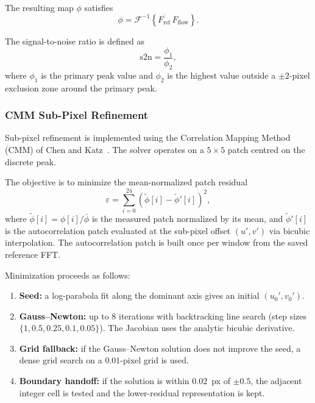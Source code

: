 \documentclass[11pt]{article}
\begin{document}
The resulting map $\phi$ satisfies
\begin{equation}
  \phi = \mathcal{F}^{-1}\!\left\{\overline{F_{\mathrm{ref}}}\,F_{\mathrm{flow}}\right\}.
\end{equation}

The signal-to-noise ratio is defined as
\begin{equation}
  \mathrm{s2n} = \frac{\phi_1}{\phi_2},
\end{equation}
where $\phi_1$ is the primary peak value and $\phi_2$ is the highest value
outside a $\pm 2$-pixel exclusion zone around the primary peak.

\subsubsection{CMM Sub-Pixel Refinement}
\label{sec:cmm}

Sub-pixel refinement is implemented using the Correlation Mapping Method
(CMM) of Chen and Katz~\cite{chen2005cmm}. The solver operates on a
$5 \times 5$ patch centred on the discrete peak.

The objective is to minimize the mean-normalized patch residual
\begin{equation}
  \varepsilon = \sum_{i=0}^{24}
    \left(\tilde{\phi}[i] - \tilde{\phi}'[i]\right)^2,
  \label{eq:cmm_obj}
\end{equation}
where $\tilde{\phi}[i] = \phi[i] / \bar{\phi}$ is the measured patch
normalized by its mean, and $\tilde{\phi}'[i]$ is the autocorrelation patch
evaluated at the sub-pixel offset $(u', v')$ via bicubic interpolation.
The autocorrelation patch is built once per window from the saved reference
FFT.

Minimization proceeds as follows:
\begin{enumerate}[noitemsep]
  \item \textbf{Seed:} a log-parabola fit along the dominant axis gives an
        initial $(u_0', v_0')$.
  \item \textbf{Gauss--Newton:} up to 8 iterations with backtracking line
        search (step sizes $\{1, 0.5, 0.25, 0.1, 0.05\}$). The Jacobian
        uses the analytic bicubic derivative.
  \item \textbf{Grid fallback:} if the Gauss--Newton solution does not improve
        the seed, a dense grid search on a $0.01$-pixel grid is used.
  \item \textbf{Boundary handoff:} if the solution is within $0.02$~px of
        $\pm 0.5$, the adjacent integer cell is tested and the lower-residual
        representation is kept.
\end{enumerate}
\end{document}
